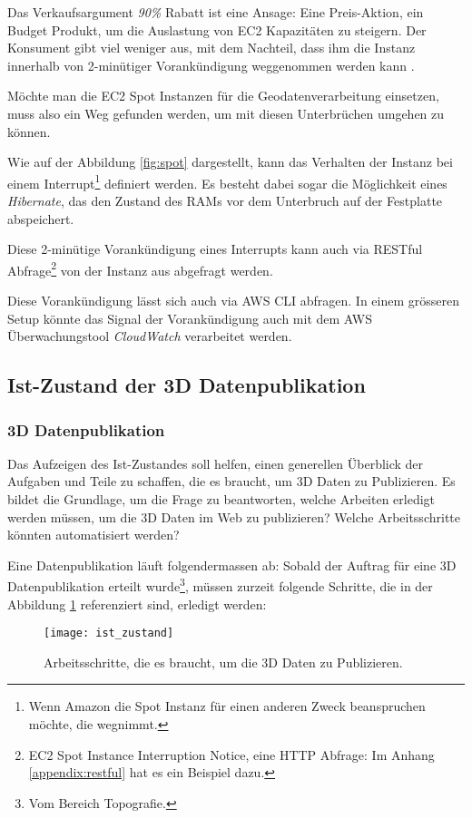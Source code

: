 Das Verkaufsargument \emph{90\%} Rabatt ist eine Ansage: Eine Preis-Aktion, ein Budget Produkt, um die Auslastung von EC2 Kapazitäten zu steigern. Der Konsument gibt viel weniger aus, mit dem Nachteil, dass ihm die Instanz innerhalb von 2-minütiger Vorankündigung weggenommen werden kann \cite{AmazonAWSSpot:1}.

Möchte man die EC2 Spot Instanzen für die Geodatenverarbeitung einsetzen, muss also ein Weg gefunden werden, um mit diesen Unterbrüchen umgehen zu können.

Wie auf der Abbildung \ref{fig:spot} dargestellt, kann das Verhalten der Instanz bei einem Interrupt\footnote{Wenn Amazon die Spot Instanz für einen anderen Zweck beanspruchen möchte, die wegnimmt.} definiert werden. Es besteht dabei sogar die Möglichkeit eines \emph{Hibernate}, das den Zustand des RAMs vor dem Unterbruch auf der Festplatte abspeichert.

Diese 2-minütige Vorankündigung eines Interrupts kann auch via RESTful Abfrage\footnote{EC2 Spot Instance Interruption Notice, eine HTTP Abfrage: Im Anhang \ref{appendix:restful} hat es ein Beispiel dazu.} von der Instanz aus abgefragt werden.

Diese Vorankündigung lässt sich auch via AWS CLI abfragen. In einem grösseren Setup könnte das Signal der Vorankündigung auch mit dem AWS Überwachungstool \emph{CloudWatch} verarbeitet werden.


\subsection{Ist-Zustand der 3D Datenpublikation}
\subsubsection{3D Datenpublikation}
Das Aufzeigen des Ist-Zustandes soll helfen, einen generellen Überblick der Aufgaben und Teile zu schaffen, die es braucht, um 3D Daten zu Publizieren. Es bildet die Grundlage, um die Frage zu beantworten, welche Arbeiten erledigt werden müssen, um die 3D Daten im Web zu publizieren? Welche Arbeitsschritte könnten automatisiert werden? 

Eine Datenpublikation läuft folgendermassen ab: Sobald der Auftrag für eine 3D Datenpublikation erteilt wurde\footnote{Vom Bereich Topografie.}, müssen zurzeit folgende Schritte, die in der Abbildung \ref{fig:ist_zustand} referenziert sind, erledigt werden:

\begin{figure}[H]
	\centering
	\texttt{[image: ist\_zustand]}
	\caption{Arbeitsschritte, die es braucht, um die 3D Daten zu Publizieren.}
	\label{fig:ist_zustand}
\end{figure}

